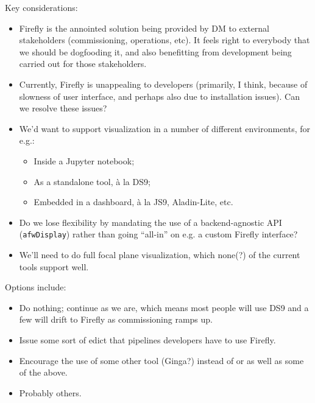 Key considerations:

\begin{itemize}

  \item{Firefly is the annointed solution being provided by DM to external
  stakeholders (commissioning, operations, etc). It feels right to everybody
  that we should be dogfooding it, and also benefitting from development being
  carried out for those stakeholders.}

  \item{Currently, Firefly is unappealing to developers (primarily, I think,
  because of slowness of user interface, and perhaps also due to installation
  issues). Can we resolve these issues?}

  \item{We'd want to support visualization in a number of different
  environments, for e.g.:

    \begin{itemize}

      \item{Inside a Jupyter notebook;}
      \item{As a standalone tool, \`a la DS9;}
      \item{Embedded in a \gls{dashboard}, \`a la JS9, Aladin-Lite, etc.}

    \end{itemize}
  }

  \item{Do we lose flexibility by mandating the use of a backend-agnostic API
  (\texttt{afwDisplay}) rather than going ``all-in'' on e.g. a custom Firefly
  interface?}

  \item{We'll need to do full focal plane visualization, which none(?) of the
  current tools support well.}

\end{itemize}

Options include:

\begin{itemize}

  \item{Do nothing; continue as we are, which means most people will use DS9
  and a few will drift to Firefly as commissioning ramps up.}

  \item{Issue some sort of edict that pipelines developers have to use
  Firefly.}

  \item{Encourage the use of some other tool (Ginga?) instead of or as well as
  some of the above.}

  \item{Probably others.}

\end{itemize}

